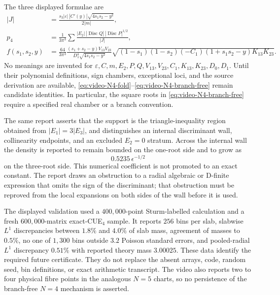 The three displayed formulae are
\begin{align}
 |J|
 &=\frac{s_3|\varepsilon|\,|C'(y)|
          \sqrt{4s_1s_2-y^2}}{2|m|},
 \label{eq:video-N4-fold}\\
 p_4
 &=\frac{1}{3\pi^3}
   \sum\frac{|E_2|\,|\operatorname{Disc}Q|\,
                    |\operatorname{Disc}P|^{1/2}}{|J|},
 \label{eq:video-N4-natural}\\
 f(s_1,s_2,y)
 &=\frac{64}{3\pi^3}
   \frac{(s_1+s_2-y)V_{13}V_{23}}{D_1^4\sqrt{4s_1s_2-y^2}}
   \sqrt{(1-s_1)(1-s_2)(-C_1)(1+s_1s_2-y)K_{13}K_{23}}.
 \label{eq:video-N4-branch-free}
\end{align}
No meanings are invented for
$\varepsilon,C,m,E_2,P,Q,V_{13},V_{23},C_1,K_{13},K_{23},D_0,D_1$.
Until their polynomial definitions, sign chambers, exceptional loci, and the source
derivation are available, \eqref{eq:video-N4-fold}--\eqref{eq:video-N4-branch-free}
remain candidate identities.  In particular, the square roots in
\eqref{eq:video-N4-branch-free} require a specified real chamber or a branch convention.

The same report asserts that the support is the triangle-inequality region obtained from
$|E_1|=3|E_3|$, and distinguishes an internal discriminant wall, collinearity endpoints,
and an excluded $E_2=0$ stratum.  Across the internal wall the density is reported to
remain bounded on the one-root side and to grow as
\[
 0.5235\,\epsilon^{-1/2}
\]
on the three-root side.  This numerical coefficient is not promoted to an exact
constant.  The report draws an obstruction to a radial algebraic or D-finite expression
that omits the sign of the discriminant; that obstruction must be reproved from the local
expansions on both sides of the wall before it is used.

The displayed validation used a $400{,}000$-point Sturm-labelled calculation and a fresh
$600{,}000$-matrix exact-CUE$_4$ sample.  It reports $256$ bins per slab, slabwise
$L^1$ discrepancies between $1.8\%$ and $4.0\%$ of slab mass, agreement of masses to
$0.5\%$, no one of $1{,}300$ bins outside $3.2$ Poisson standard errors, and pooled-radial
$L^1$ discrepancy $0.51\%$ with reported theory mass $3.00025$.  These data identify the
required future certificate.  They do not replace the absent arrays, code, random seed,
bin definitions, or exact arithmetic transcript.  The video also reports two to four
physical fibre points in the analogous $N=5$ charts, so no persistence of the
branch-free $N=4$ mechanism is asserted.

